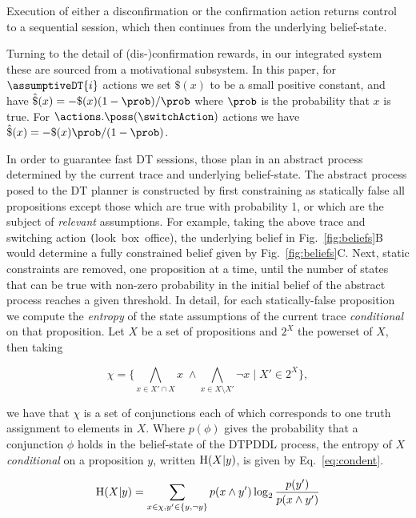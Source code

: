 Execution of either a disconfirmation or the confirmation action
returns control to a sequential session, which then continues from the
underlying belief-state.

Turning to the detail of (dis-)confirmation rewards, in our integrated
system these are sourced from a motivational subsystem. In this paper,
for $\assumptiveDT{i}$ actions we set $\$(x)$ to be a small positive
constant, and have $\hat\$(x)= - \$(x)(1 - \prob) /
\prob$ where $\prob$ is the probability that $x$ is true. For
$\actions.\poss(\switchAction)$ actions we have $\hat\$(x)= -
\$(x)\prob/(1-\prob)$.



In order to guarantee fast DT sessions, those plan in an abstract
process determined by the current trace and underlying belief-state.
The abstract process posed to the DT planner is constructed by first
constraining as statically false all propositions except those which
are true with probability 1, or which are the subject of {\em
relevant} assumptions. For example, taking the above trace and
switching action {\texttt (look~box~office)}, the underlying
belief in Fig.~\ref{fig:beliefs}B would determine a fully
constrained belief given by Fig.~\ref{fig:beliefs}C.
Next, static constraints are removed, one proposition at a time, until
the number of states that can be true with non-zero probability in the
initial belief of the abstract process reaches a given threshold.
In detail, for each statically-false proposition we compute the {\em
entropy} of the state assumptions of the current trace {\em
conditional} on that proposition. 
Let $X$ be a set of propositions and $2^X$ the powerset of $X$, then taking



\small
\[
\chi = \{\bigwedge_{x \in X'
  \cap X}x \; \land \bigwedge_{x \in X \setminus X'}\neg x \;|\; X' \in 2^X\},
\]
\normalsize

\noindent we have that $\chi$ is a set of conjunctions each of which
corresponds to one truth assignment to elements in $X$. Where
$p(\phi)$ gives the probability that a conjunction $\phi$ holds in the
belief-state of the DTPDDL process, the entropy of $X$
\emph{conditional} on a proposition $y$, written $\entropy(X|y)$, is
given by Eq.~\ref{eq:condent}.

\vspace{-1ex}
\small
\begin{equation}\label{eq:condent}
  \entropy(X|y) = \sum_{x \in \chi, y' \in \{y, \neg y\}} p(x \land y') \log_2
  \frac{p(y')}{p(x \land y')}
\end{equation}
\normalsize

